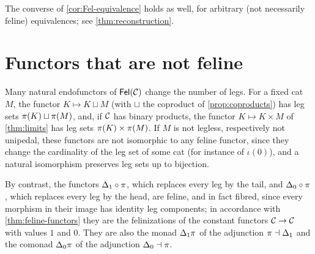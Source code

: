The converse of \cref{cor:Fel-equivalence} holds as well, for arbitrary (not
necessarily feline) equivalences; see \cref{thm:reconstruction}.

\section{Functors that are not feline}\label{sec:non-feline}

Many natural endofunctors of $\mathsf{Fel}(\mathcal{C})$ change the number of legs. For a
fixed cat $M$, the functor $K\mapsto K\sqcup M$ (with $\sqcup$ the coproduct of
\cref{prop:coproducts}) has leg sets $\pi(K)\sqcup\pi(M)$, and, if $\mathcal{C}$ has
binary products, the functor $K\mapsto K\times M$ of \cref{thm:limits} has leg
sets $\pi(K)\times\pi(M)$. If $M$ is not legless, respectively not
unipedal, these functors are not isomorphic to any feline functor, since they
change the cardinality of the leg set of some cat (for instance of $\iota(0)$),
and a natural isomorphism preserves leg sets up to bijection.

By contrast, the functors $\Delta_1\circ\pi$, which replaces every leg by the
tail, and $\Delta_0\circ\pi$, which replaces every leg by the head, are feline,
and in fact fibred, since every morphism in their image has identity leg
components; in accordance with
\cref{thm:feline-functors} they are the felinizations of the constant functors
$\mathcal{C}\to\mathcal{C}$ with values $1$ and $0$. They are also the monad
$\Delta_1\pi$ of the adjunction $\pi\dashv\Delta_1$ and the comonad
$\Delta_0\pi$ of the adjunction $\Delta_0\dashv\pi$.
